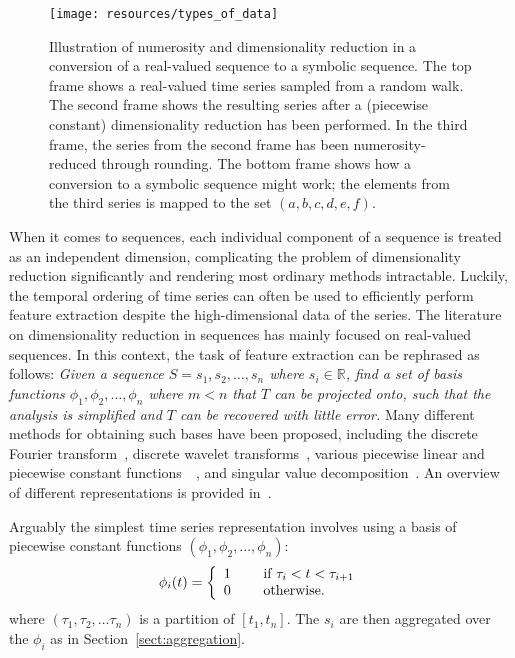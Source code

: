 \begin{figure}[htb]
  \begin{center}
    \leavevmode
    \texttt{[image: resources/types\_of\_data]}
  \end{center}
  \caption{\small{Illustration of numerosity and dimensionality reduction in a conversion of a real-valued sequence to a symbolic sequence. The top frame shows a real-valued time series sampled from a random walk. The second frame shows the resulting series after a (piecewise constant) dimensionality reduction has been performed. In the third frame, the series from the second frame has been numerosity-reduced through rounding. The bottom frame shows how a conversion to a symbolic sequence might work; the elements from the third series is mapped to the set $(a,b,c,d,e,f)$.}}
\label{fig:types_of_data}
\end{figure}

When it comes to sequences, each individual component of a sequence is treated as an independent dimension, complicating the problem of dimensionality reduction significantly and rendering most ordinary methods intractable. Luckily, the temporal ordering of time series can often be used to efficiently perform feature extraction despite the high-dimensional data of the series. The literature on dimensionality reduction in sequences has mainly focused on real-valued sequences. In this context, the task of feature extraction can be rephrased as follows: \emph{Given a sequence $S = s_1, s_2, \dots, s_n$ where $s_i \in \mathbb{R}$, find a set of basis functions $\phi_1, \phi_2, \dots, \phi_n$ where $m < n$ that $T$ can be projected onto, such that the analysis is simplified and $T$ can be recovered with little error.} Many different methods for obtaining such bases have been proposed, including the discrete Fourier transform~\cite{faloutsos1}, discrete wavelet transforms~\cite{pong}, various piecewise linear and piecewise constant functions~\cite{keogh3}~\cite{geurts}, and singular value decomposition~\cite{keogh3}. An overview of different representations is provided in~\cite{fabian}.

Arguably the simplest time series representation involves using a basis of piecewise constant functions $(\phi_1, \phi_2, \dots, \phi_n)$:
\[
  \phi_i(t) = \left\{
    \begin{array}{l l}
      1 & \quad \text{ if } \tau_i < t < \tau_{i+1} \\
      0 & \quad \text{ otherwise.} \\
    \end{array} \right.
\]
where $(\tau_1, \tau_2, \dots \tau_n)$ is a partition of $[t_1, t_n]$. The $s_i$ are then aggregated over the $\phi_i$ as in Section~\ref{sect:aggregation}.

